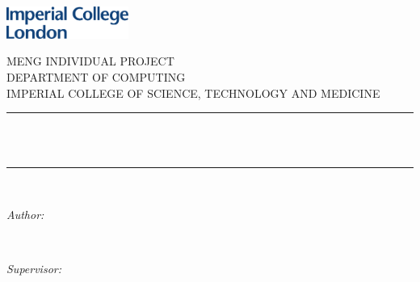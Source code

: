 \begin{titlepage}

\newcommand{\HRule}{\rule{\linewidth}{0.5mm}} %


\includegraphics[width = 4cm]{./figures/imperial}\\[0.5cm] 

\center %
 
{\LARGE MENG INDIVIDUAL PROJECT}\\[1.6cm] 
{\Large DEPARTMENT OF COMPUTING}\\[0.6cm] 
{\large IMPERIAL COLLEGE OF SCIENCE, TECHNOLOGY AND MEDICINE}\\[0.65cm]


\HRule \\[0.4cm]
{ \huge \bfseries \reporttitle}\\ %
\HRule \\[1.5cm]
 


\begin{minipage}{0.4\textwidth}
\begin{flushleft} \large
\textit{Author:}\\
\reportauthor %
\end{flushleft}
\end{minipage}
~
\begin{minipage}{0.4\textwidth}
\begin{flushright} \large
\textit{Supervisor:} \\
\supervisor %
\end{flushright}
\end{minipage}\\[4cm]





\end{titlepage}
